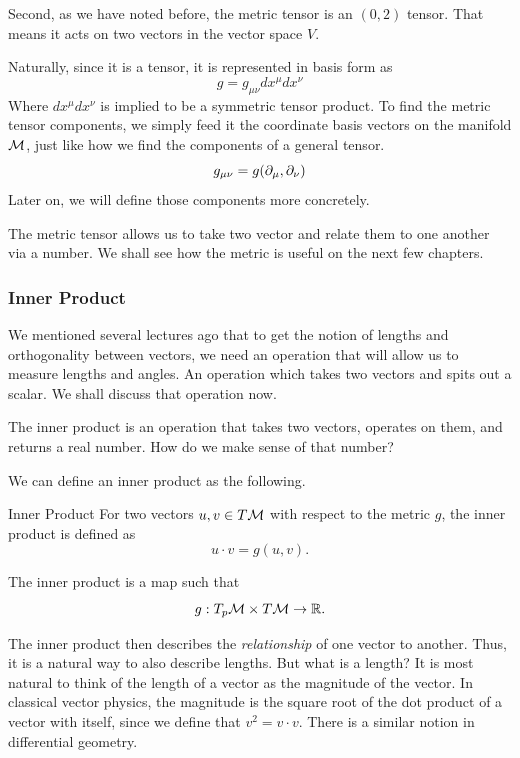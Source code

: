 	Second, as we have noted before, the metric tensor is an $(0,2)$ tensor. That means it acts 
	on two vectors in the vector space $V$. 
	
	Naturally, since it is a tensor, it is represented in basis form as 
	\[
		g = g_{\mu\nu} dx^\mu dx^\nu
	\]
	Where $dx^\mu dx^\nu$ is implied to be a symmetric tensor product. To find the metric tensor
	components, we simply feed it the coordinate basis vectors on the manifold $\mathcal M$, just like
	how we find the components of a general tensor.
	\[
		g_{\mu\nu}  = g(\partial_\mu, \partial_\nu)
	\]
	Later on, we will define those components more concretely. 

	The metric tensor allows us to take two vector and relate them to one another via a number.
	We shall see how the metric is useful on the next few chapters.

\subsubsection{Inner Product}
	\label{subsubsec:inner-product}
	We mentioned several lectures ago that
	to get the notion of lengths and orthogonality
	between vectors, we need an operation that will
	allow us to measure lengths and angles. An operation
	which takes two vectors and spits out a scalar.
	We shall discuss that operation now.

	The inner product is an operation that takes two vectors, operates on them,
	and returns a real number. How do we make sense of that number?

	We can define an inner product as the following.
	\begin{definition}{Inner Product}
		For two vectors $u,v\in T\mathcal{M}$ with respect to the metric $g$,
		the inner product is defined as
		\begin{equation}
			\label{eq:inner-product}
			u\cdot v = g(u,v).
		\end{equation}

		The inner product is a map such that
		\[
			g:T_p\mathcal{M}\times T\mathcal{M}\to\mathbb{R}.
		\]
	\end{definition}

	The inner product then describes the \textit{relationship} of one vector
	to another. Thus, it is a natural way to also describe lengths. But what is a length?
	It is most natural to think of the length of a vector as the magnitude of the vector.
	In classical vector physics, the magnitude is the square root of the dot product
	of a vector with itself, since we define that $v^2 = v\cdot v$. There is a
	similar notion in differential geometry.

